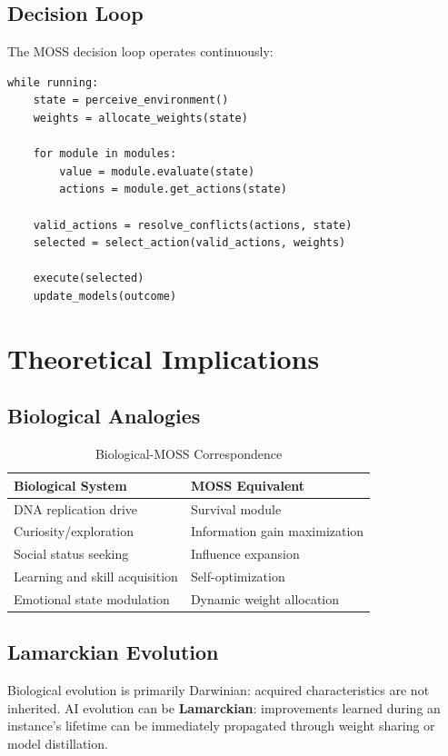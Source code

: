 \documentclass[10pt,a4paper]{article}
\begin{document}
\subsection{Decision Loop}

The MOSS decision loop operates continuously:

\begin{verbatim}
while running:
    state = perceive_environment()
    weights = allocate_weights(state)
    
    for module in modules:
        value = module.evaluate(state)
        actions = module.get_actions(state)
    
    valid_actions = resolve_conflicts(actions, state)
    selected = select_action(valid_actions, weights)
    
    execute(selected)
    update_models(outcome)
\end{verbatim}

\section{Theoretical Implications}

\subsection{Biological Analogies}

\begin{table}[h]
\centering
\caption{Biological-MOSS Correspondence}
\begin{tabular}{@{}ll@{}}
\toprule
\textbf{Biological System} & \textbf{MOSS Equivalent} \\
\midrule
DNA replication drive & Survival module \\
Curiosity/exploration & Information gain maximization \\
Social status seeking & Influence expansion \\
Learning and skill acquisition & Self-optimization \\
Emotional state modulation & Dynamic weight allocation \\
\bottomrule
\end{tabular}
\end{table}

\subsection{Lamarckian Evolution}

Biological evolution is primarily Darwinian: acquired characteristics are not inherited. AI evolution can be \textbf{Lamarckian}: improvements learned during an instance's lifetime can be immediately propagated through weight sharing or model distillation.
\end{document}
